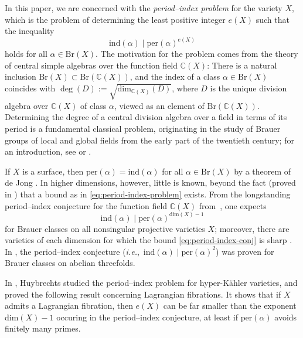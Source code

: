 \documentclass[11pt]{amsart}
\theoremstyle{plain}
\theoremstyle{definition}
\theoremstyle{remark}
\begin{document}
In this paper, we are concerned with the \emph{period--index problem} for the variety $X$, which is the problem of determining the least positive integer $e(X)$ such that the inequality
\begin{equation}
\label{eq:period-index-problem}
    \mathrm{ind}(\alpha) \mid \mathrm{per}(\alpha)^{e(X)}
\end{equation}
holds for all $\alpha \in \mathrm{Br}(X)$. 
The motivation for the problem comes from the theory of central simple algebras over the function field $\mathbb{C}(X)$:
There is a natural inclusion $\mathrm{Br}(X) \subset \mathrm{Br}(\mathbb{C}(X))$, and the index of a class $\alpha \in \mathrm{Br}(X)$ coincides with $\deg(D) := \sqrt{\mathrm{dim}_{\mathbb{C}(X)}(D)}$, where $D$ is the unique division algebra over $\mathbb{C}(X)$ of class $\alpha$, viewed as an element of $\mathrm{Br}(\mathbb{C}(X))$.
Determining the degree of a central division algebra over a field in terms of its period is a fundamental classical problem, originating in the study of Brauer groups of local and global fields from the early part of the twentieth century; for an introduction, see \cite[Section 4]{Auel} or \cite{CT-bourbaki}.

If $X$ is a surface, then $\mathrm{per}(\alpha) = \mathrm{ind}(\alpha)$ for all $\alpha \in \mathrm{Br}(X)$ by a theorem of de Jong \cite{dJ}.
In higher dimensions, however, little is known, beyond the fact (proved in \cite{HM2}) that a bound as in \eqref{eq:period-index-problem} exists. 
From the longstanding period--index conjecture for the function field $\mathbb{C}(X)$ from~\cite{CT-german}, one expects
\begin{equation}
\label{eq:period-index-conj}
    \mathrm{ind}(\alpha) \mid \mathrm{per}(\alpha)^{\mathrm{dim}(X) - 1}
\end{equation}
for Brauer classes on all nonsingular projective varieties $X$; moreover, there are varieties of each dimension for which the bound \eqref{eq:period-index-conj} is sharp \cite{CT-gabber}.
In \cite{HP}, the period--index conjecture (\emph{i.e.},~$\mathrm{ind}(\alpha) \mid \mathrm{per}(\alpha)^2$) was proven for Brauer classes on abelian threefolds.

In \cite{H_PI}, Huybrechts studied the period--index problem for hyper-K\"ahler varieties, and proved the following result concerning Lagrangian fibrations. It shows that if $X$ admits a Lagrangian fibration, then $e(X)$ can be far smaller than the exponent $\mathrm{dim}(X)-1$ occuring in the period--index conjecture, at least if $\mathrm{per}(\alpha)$ avoids finitely many primes.
\end{document}
